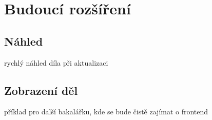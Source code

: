 
\chapter{Budoucí rozšíření}
    
    \section{Náhled}
        rychlý náhled díla při aktualizaci
        
    \section{Zobrazení děl}
        příklad pro další bakalářku, kde se bude čistě zajímat o frontend

